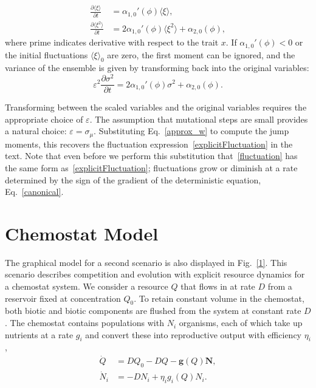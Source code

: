 \begin{align*}
\frac{\partial \langle \xi \rangle}{\partial t} &= \alpha_{1,0}'(\phi)\langle \xi \rangle, \\
\frac{\partial \langle \xi^2 \rangle }{\partial t} &= 2\alpha_{1,0}'(\phi)\langle \xi^2 \rangle + \alpha_{2,0}(\phi),
\end{align*}
where prime indicates derivative with respect to the trait $x$. If $\alpha_{1,0}'(\phi)<0$ or the initial fluctuations $\langle \xi \rangle_0$ are zero, the first moment can be ignored, and the variance of the ensemble is given by transforming back into the original variables:
\begin{equation}
\varepsilon^2 \frac{\partial \sigma^2 }{\partial t} = 2\alpha_{1,0}'(\phi)\sigma^2 + \alpha_{2,0}(\phi). \label{fluctuation}
\end{equation}
 
Transforming between the scaled variables and the original variables requires the appropriate choice of $\varepsilon$.  The assumption that mutational steps are small provides a natural choice: $\varepsilon = \sigma_{\mu}$.   Substituting Eq.~\eqref{approx_w} to compute the jump moments, this recovers the fluctuation expression~\eqref{explicitFluctuation} in the text.  Note that even before we perform this substitution that~\eqref{fluctuation} has the same form as~\eqref{explicitFluctuation}; fluctuations grow or diminish at a rate determined by the sign of the gradient of the deterministic equation, Eq.~\eqref{canonical}. 
 
 
 
\section{Chemostat Model}\label{ChemostatModel}
The graphical model for a second scenario is also displayed in Fig.~\ref{1}. This scenario describes competition and evolution with explicit resource dynamics for a chemostat system.   We consider a resource $Q$ that flows in at rate $D$ from a reservoir fixed at concentration $Q_0$.  To retain constant volume in the chemostat, both biotic and biotic components are flushed from the system at constant rate $D$.  The chemostat contains populations with $N_i$ organisms, each of which take up nutrients at a rate $g_i$ and convert these into reproductive output with efficiency $\eta_i$, 
\begin{align}
	\dot Q & =  D Q_0 - D Q - \mathbf{g}(Q) \mathbf{N}, \\
	\dot N_i & = -D N_i + \eta_i g_i(Q) N_i. 
\end{align}
 
